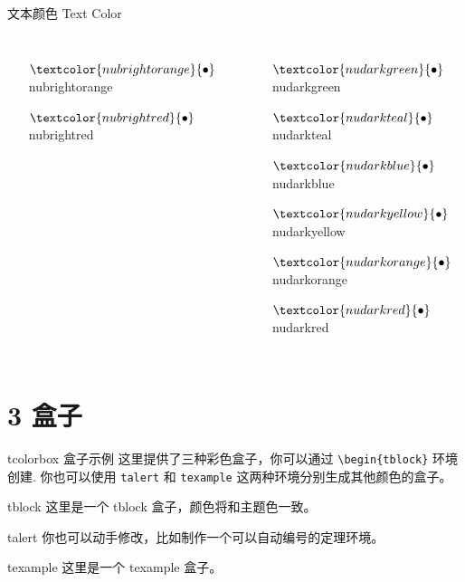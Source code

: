 \documentclass[10pt,aspectratio=169,fontset=none]{ctexbeamer}
\begin{document}
\begin{frame}{文本颜色 Text Color}
\begin{columns}
\begin{itemize}
                \item[$\textcolor{nubrightorange}{\bullet}$] \textcolor{nubrightorange}{nubrightorange}
                \item[$\textcolor{nubrightred}{\bullet}$] \textcolor{nubrightred}{nubrightred}
            \end{itemize}
            \begin{itemize}
                \item[$\textcolor{nudarkgreen}{\bullet}$] \textcolor{nudarkgreen}{nudarkgreen}
                \item[$\textcolor{nudarkteal}{\bullet}$] \textcolor{nudarkteal}{nudarkteal}
                \item[$\textcolor{nudarkblue}{\bullet}$] \textcolor{nudarkblue}{nudarkblue}
                \item[$\textcolor{nudarkyellow}{\bullet}$] \textcolor{nudarkyellow}{nudarkyellow}
                \item[$\textcolor{nudarkorange}{\bullet}$] \textcolor{nudarkorange}{nudarkorange}
                \item[$\textcolor{nudarkred}{\bullet}$] \textcolor{nudarkred}{nudarkred}
            \end{itemize}
        \end{columns}
    \end{frame}

    \section{3 盒子}

    \begin{frame}{tcolorbox 盒子示例}
        这里提供了三种彩色盒子，你可以通过 \texttt{\textcolor{primary}{\textbackslash begin}\{tblock\}} 环境创建. 你也可以使用 \texttt{talert} 和 \texttt{texample} 这两种环境分别生成其他颜色的盒子。
        \begin{tblock}{tblock}
            这里是一个 tblock 盒子，颜色将和主题色一致。
        \end{tblock}
        \begin{talert}{talert}
            你也可以动手修改，比如制作一个可以自动编号的定理环境。
        \end{talert}
        \begin{texample}{texample}
            这里是一个 texample 盒子。
        \end{texample}
    \end{frame}
\end{document}
